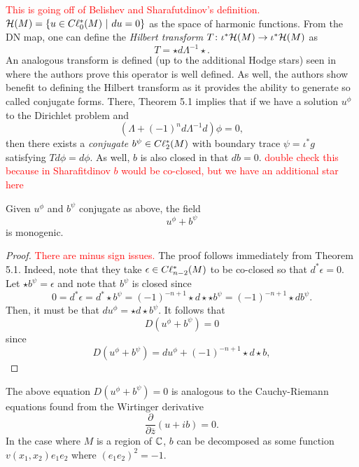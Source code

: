 \documentclass[12pt]{article}
\begin{document}
\textcolor{red}{This is going off of Belishev and Sharafutdinov's definition.}
$\mathcal{H}(M) = \{u \in C\ell_{0}^*(M) ~\vert~ du=0\}$ as the space of harmonic functions.  From the DN map, one can define the \emph{Hilbert transform} $T\colon \iota^* \mathcal{H}(M) \to \iota^* \mathcal{H}(M)$ as 
\[
T = \star d\Lambda^{-1} \star.
\]
An analogous transform is defined (up to the additional Hodge stars) seen in \cite{belishev_dirichlet_2008} where the authors prove this operator is well defined. As well, the authors show benefit to defining the Hilbert transform as it provides the ability to generate so called conjugate forms.  There, Theorem 5.1 implies that if we have a solution $u^\phi$ to the Dirichlet problem and
\begin{equation}
\label{eq:conjugate_requirement}
\left( \Lambda + (-1)^{n}d\Lambda^{-1}d\right)\phi = 0, 
\end{equation}
then there exists a \emph{conjugate} $b^\psi \in C\ell_{2}^*(M)$ with boundary trace $\psi = \iota^* g$ satisfying $Td\phi = d \phi$. As well, $b$ is also closed in that $db=0$. \textcolor{red}{double check this because in Sharafitdinov $b$ would be co-closed, but we have an additional star here}  

\begin{lemma}
Given $u^\phi$ and $b^\psi$ conjugate as above, the field
\[
u^\phi + b^\psi
\]
is monogenic.
\end{lemma}
\begin{proof}
\textcolor{red}{There are minus sign issues.} The proof follows immediately from Theorem 5.1.  Indeed, note that they take $\epsilon \in C\ell_{n-2}^*(M)$ to be co-closed so that $d^*\epsilon =0$.  Let $\star b^\psi = \epsilon$ and note that $b^\psi$ is closed since
\[
0=d^* \epsilon = d^*\star b^\psi = (-1)^{-n+1} \star d \star \star b^\psi = (-1)^{-n+1} \star d b^\psi.
\]
Then, it must be that $du^\phi = \star d \star b^\psi$. It follows that
\[
D(u^\phi + b^\psi) = 0
\]
since
\[
D(u^\phi + b^\psi) = du^\phi +(-1)^{-n+1} \star d \star b,
\]
\end{proof}

\begin{remark}
The above equation $D(u^\phi + b^\psi)=0$ is analogous to the Cauchy-Riemann equations found from the Wirtinger derivative
\[
\frac{\partial}{\partial \overline{z}} (u+ib) = 0.
\]
In the case where $M$ is a region of $\mathbb{C}$, $b$ can be decomposed as some function $v(x_1,x_2)e_1e_2$ where $(e_1e_2)^2=-1$.  
\end{remark}
\end{document}
